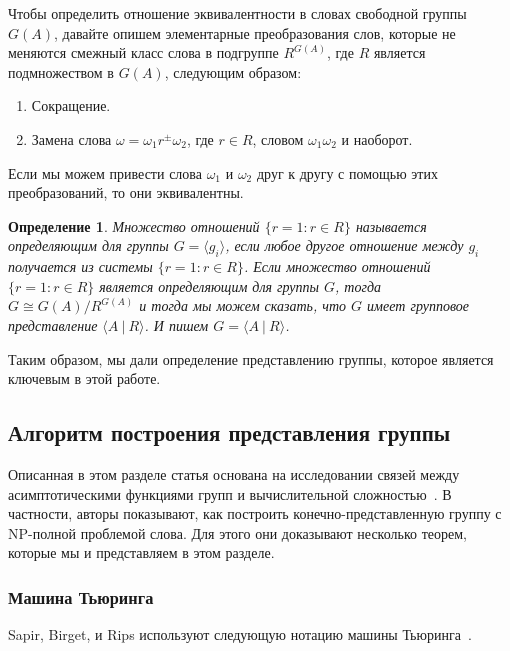 \documentclass[14pt]{matmex-diploma-custom}
\newtheorem{defn}{Определение}[subsection]
\begin{document}
Чтобы определить отношение эквивалентности в словах свободной группы $G(A)$, давайте опишем элементарные преобразования слов, которые не меняются
смежный класс слова в подгруппе $ R^{G (A)} $, где $ R $ является подмножеством в $ G (A) $, следующим образом:
\begin{enumerate}
\item Сокращение.
\item Замена слова $\omega = \omega_1 r^{\pm} \omega_2$, где $r \in R$, словом $\omega_1 \omega_2$ и наоборот.
\end{enumerate}

Если мы можем привести слова $ \omega_1 $ и $ \omega_2 $ друг к
другу с помощью этих преобразований, то они эквивалентны.

\begin{defn}
Множество отношений $ \{r = 1: r \in R \} $ называется определяющим для группы
$ G = \langle g_i \rangle $, если любое другое отношение между
$ g_i $ получается из системы $ \{r = 1: r \in R \} $. Если множество отношений
$ \{r = 1: r \in R \} $ является определяющим для группы $ G $, тогда $ G \cong G (A)/R^{G (A)} $
и тогда мы можем сказать, что $ G $ имеет групповое представление $ \langle A ~|~ R \rangle $.
И пишем $G = \langle A ~|~ R \rangle $.
\end{defn}

Таким образом, мы дали определение представлению группы, которое является ключевым в этой работе. 

\subsection{Алгоритм построения представления группы}

Описанная в этом разделе статья основана на исследовании связей
между асимптотическими функциями групп и вычислительной сложностью~\cite{Sapir}.
В частности, авторы показывают, как построить конечно-представленную группу
с NP-полной проблемой слова. Для этого они доказывают несколько теорем,
которые мы и представляем в этом разделе.

\subsubsection{Машина Тьюринга}

Sapir, Birget, и Rips используют следующую нотацию машины Тьюринга~\cite{Sapir}.
\end{document}
